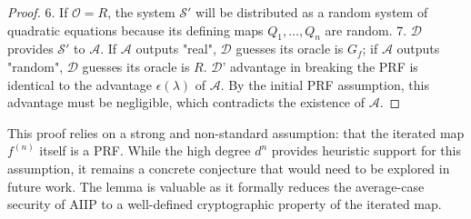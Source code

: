 \begin{proof}
                6.  If $\mathcal{O} = R$, the system $\mathcal{S}'$ will be distributed as a random system of quadratic equations because its defining maps $Q_1, \ldots, Q_n$ are random.
                7.  $\mathcal{D}$ provides $\mathcal{S}'$ to $\mathcal{A}$. If $\mathcal{A}$ outputs "real", $\mathcal{D}$ guesses its oracle is $G_f$; if $\mathcal{A}$ outputs "random", $\mathcal{D}$ guesses its oracle is $R$.
                $\mathcal{D}$' advantage in breaking the PRF is identical to the advantage $\epsilon(\lambda)$ of $\mathcal{A}$. By the initial PRF assumption, this advantage must be negligible, which contradicts the existence of $\mathcal{A}$.
            \end{proof}
            \begin{remark}
                This proof relies on a strong and non-standard assumption: that the iterated map $f^{(n)}$ itself is a PRF. While the high degree $d^n$ provides heuristic support for this assumption, it remains a concrete conjecture that would need to be explored in future work. The lemma is valuable as it formally reduces the average-case security of AIIP to a well-defined cryptographic property of the iterated map.
            \end{remark}
